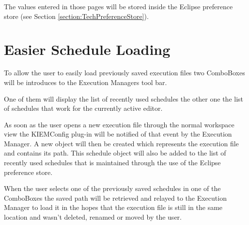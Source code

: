 The values entered in those pages will be stored inside the Eclipse preference
store (see Section \ref{section:TechPreferenceStore}).

\section{Easier Schedule Loading}
\label{section:ConfConceptsEasyLoading}
To allow the user to easily load previously saved execution files two ComboBoxes will be introduces
to the Execution Managers tool bar.

One of them will display the list of recently used schedules the other one the
list of schedules that work for the currently active editor.

As soon as the user opens a new execution file through the normal workspace
view the \ac{KIEMConfig} plug-in will be notified of that event by the Execution Manager.
A new object will then be created which represents the execution file and contains its path.
This schedule object will also be added to the list of recently used schedules that is maintained through the 
use of the Eclipse preference store.

When the user selects one of the previously saved schedules in one of the
ComboBoxes the saved path will be retrieved and relayed to the Execution Manager to
load it in the hopes that the execution file is still in the same location and
wasn't deleted, renamed or moved by the user.
